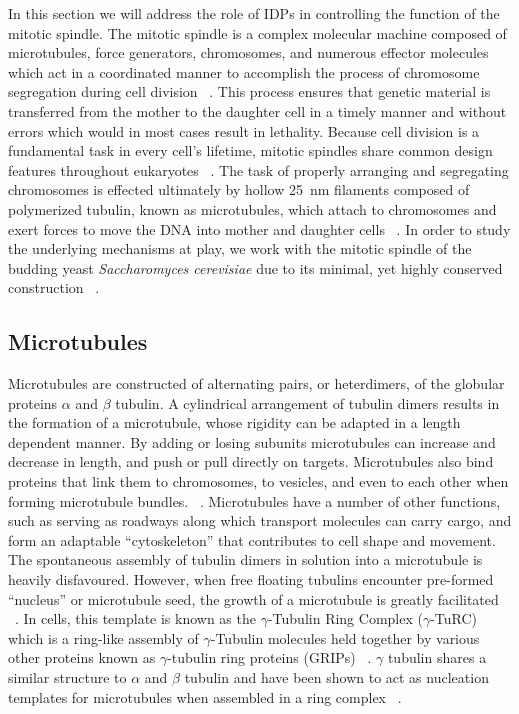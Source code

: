 In this section we will address the role of IDPs in controlling the function of the mitotic spindle. The mitotic spindle is a complex molecular machine composed of microtubules, force generators, chromosomes, and numerous effector molecules which act in a coordinated manner to accomplish the process of chromosome segregation during cell division ~\cite{karsenti2001mitotic}. This process ensures that genetic material is transferred from the mother to the daughter cell in a timely manner and without errors which would in most cases result in lethality. Because cell division is a fundamental task in every cell's lifetime, mitotic spindles share common design features throughout eukaryotes ~\cite{kubai1976evolution}. The  task  of properly  arranging  and  segregating  chromosomes  is effected ultimately  by hollow \SI{25}{\nm} filaments composed of polymerized tubulin, known as microtubules,  which attach to chromosomes and exert forces to move the  DNA into mother and daughter  cells ~\cite{kline2004mitotic}.  In order to study the underlying mechanisms at play, we work with the mitotic spindle of the budding yeast {\it Saccharomyces cerevisiae} due to its minimal, yet highly conserved construction ~\cite{kubai1976evolution}. 

\subsection{Microtubules}

Microtubules are constructed of alternating pairs, or heterdimers, of the globular proteins $\alpha$ and $\beta$ tubulin. A cylindrical  arrangement  of tubulin  dimers results  in the  formation  of a microtubule, whose rigidity can be adapted in a length dependent manner.   By adding or losing subunits microtubules can increase and decrease in length, and push or pull directly on targets.  Microtubules also bind proteins that link them to chromosomes, to vesicles, and even to each other when forming microtubule bundles.  ~\cite{dogterom2005force}. Microtubules  have a number  of other  functions,  such  as serving as roadways  along which transport molecules can carry cargo, and form an adaptable “cytoskeleton” that contributes to cell shape and movement. The spontaneous assembly of tubulin dimers in solution into a microtubule is heavily disfavoured. However, when free floating tubulins encounter pre-formed “nucleus” or microtubule seed, the growth of a microtubule is greatly facilitated  ~\cite{joshi1992gamma}. In cells, this template is known as the $\gamma$-Tubulin Ring Complex ($\gamma$-TuRC) which is a ring-like assembly of $\gamma$-Tubulin molecules held together by various other proteins known as $\gamma$-tubulin ring proteins (GRIPs) ~\cite{kollman2011microtubule}. $\gamma$ tubulin shares a similar structure to $\alpha$ and $\beta$ tubulin and have been shown to act as nucleation templates for microtubules when assembled in a ring complex ~\cite{kollman2011microtubule}. 

